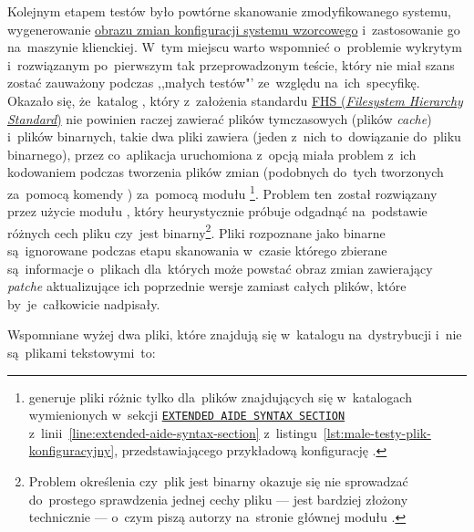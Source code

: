 \documentclass[thesis]{subfiles}
\begin{document}
Kolejnym etapem testów było powtórne skanowanie zmodyfikowanego systemu, wygenerowanie \hyperref[sec:obraz-zmian-konfiguracji]{obrazu zmian konfiguracji systemu wzorcowego} i~zastosowanie go na~maszynie klienckiej. W~tym miejscu warto wspomnieć o~problemie wykrytym i~rozwiązanym po~pierwszym tak przeprowadzonym teście, który nie miał szans zostać zauważony podczas ,,małych testów"' ze~względu na~ich~specyfikę. Okazało się, że~katalog , który z~założenia standardu \href{https://en.wikipedia.org/wiki/Filesystem_Hierarchy_Standard}{FHS (\emph{Filesystem Hierarchy Standard})} nie powinien raczej zawierać plików tymczasowych (plików \emph{cache}) i~plików binarnych, takie dwa pliki zawiera (jeden z~nich to~dowiązanie do~pliku binarnego), przez co~aplikacja \texttt{\srvappname{}} uruchomiona z~opcją  miała problem z~ich kodowaniem podczas tworzenia plików zmian (podobnych do~tych tworzonych za~pomocą komendy ) za~pomocą modułu \footnote{\texttt{\srvappname{}} generuje pliki różnic tylko dla~plików znajdujących się w~katalogach wymienionych w~sekcji \hyperref[line:extended-aide-syntax-section]{\texttt{EXTENDED AIDE SYNTAX SECTION}} z~linii~\ref{line:extended-aide-syntax-section} z~listingu~\ref{lst:male-testy-plik-konfiguracyjny}, przedstawiającego przykładową konfigurację \texttt{\srvappname{}}.}. Problem ten~został rozwiązany przez użycie modułu , który heurystycznie próbuje odgadnąć na~podstawie różnych cech pliku czy~jest binarny\footnote{Problem określenia czy~plik jest binarny okazuje się nie sprowadzać do~prostego sprawdzenia jednej cechy pliku --- jest bardziej złożony technicznie --- o~czym piszą autorzy na~stronie głównej modułu .}. Pliki rozpoznane jako binarne są~ignorowane podczas etapu skanowania w~czasie którego zbierane są~informacje o~plikach dla~których może powstać obraz zmian zawierający \emph{patche} aktualizujące ich poprzednie wersje zamiast całych plików, które by~je~całkowicie nadpisały.

Wspomniane wyżej dwa pliki, które znajdują się w~katalogu  na~dystrybucji \debian{} i~nie są~plikami tekstowymi~to:
\end{document}
